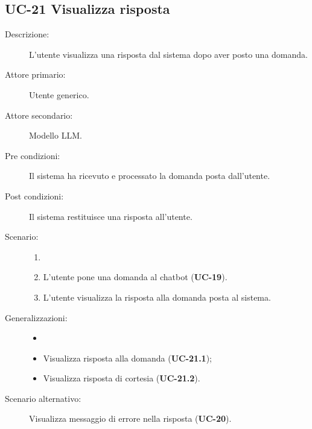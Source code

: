 \subsection{UC-21 Visualizza risposta}
\begin{description}
    \item[Descrizione:] L'utente visualizza una risposta dal sistema dopo aver posto una domanda.
    \item[Attore primario:] Utente generico.
    \item[Attore secondario:] Modello LLM. 
    \item[Pre condizioni:] Il sistema ha ricevuto e processato la domanda posta dall'utente.
    \item[Post condizioni:] Il sistema restituisce una risposta all'utente.
    
    \item[Scenario:]
    \begin{enumerate}
        \item[]
        \item L’utente pone una domanda al chatbot (\textbf{UC-19}).
        \item L'utente visualizza la risposta alla domanda posta al sistema.
    \end{enumerate}
    \item[Generalizzazioni:]
    \begin{itemize}
        \item[] 
        \item Visualizza risposta alla domanda (\textbf{UC-21.1});
        \item Visualizza risposta di cortesia (\textbf{UC-21.2}).
    \end{itemize}
    \item[Scenario alternativo:] Visualizza messaggio di errore nella risposta (\textbf{UC-20}).
\end{description}

